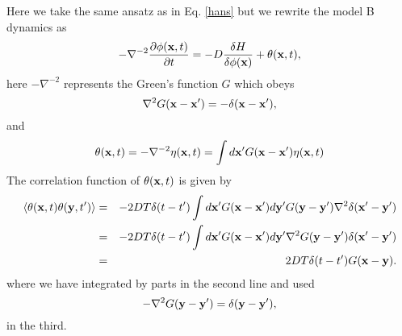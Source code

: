 \documentclass[11pt]{report}
\begin{document}

Here we take the same ansatz as in Eq. \eqref{hans} but we rewrite the model B dynamics as
\begin{equation}
-\nabla^{-2} \frac{\partial\phi({\bf x},t)}{\partial t} = -D \frac{\delta H}{\delta \phi({\bf x})}+ 
\theta({\bf x},t),
\end{equation}
here $-\nabla^{-2}$ represents the Green's function $G$ which obeys 
\begin{equation}
\nabla^2 G({\bf x}-{\bf x'}) = -\delta({\bf x}-{\bf x}'),
\end{equation}
and 
\begin{equation}
\theta({\bf x},t)=-\nabla^{-2}\eta({\bf x},t)= \int d{\bf x}'G({\bf x}-{\bf x'})\eta({\bf x},t)
\end{equation}
The correlation function of $\theta({\bf x},t)$ is given by
\begin{eqnarray}
\langle \theta({\bf x},t)\theta({\bf y},t')\rangle &=&-2DT\delta(t-t') \int d{\bf x}'G({\bf x}-{\bf x'})d{\bf y}'G({\bf y}-{\bf y'})\nabla^2\delta({\bf x}'-{\bf y}') \\
&=& -2DT\delta(t-t') \int d{\bf x}'G({\bf x}-{\bf x'})d{\bf y}'\nabla^2G({\bf y}-{\bf y'})\delta({\bf x}'-{\bf y}') \\
&=& 2DT\delta(t-t') G({\bf x}-{\bf y}).
\end{eqnarray}
where we have integrated by parts in the second line and used 
\begin{equation}
-\nabla^2G({\bf y}-{\bf y'})= \delta({\bf y}-{\bf y}'),
\end{equation}
in the third.
\end{document}
